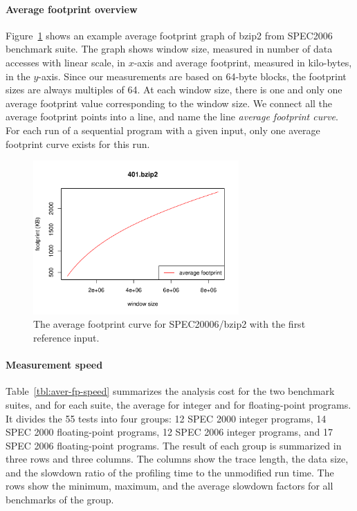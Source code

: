 \paragraph{Average footprint overview}
Figure~\ref{fig:aver-fp-bzip2} shows an example average footprint
graph of bzip2 from SPEC2006 benchmark suite. The graph shows window
size, measured in number of data accesses with linear scale, in
$x$-axis and average footprint, measured in kilo-bytes, in the
$y$-axis. Since our measurements are based on 64-byte blocks, the
footprint sizes are always multiples of 64. At each window size, there
is one and only one average footprint value corresponding to the window
size. We connect all the average footprint points into a line, and
name the line {\em average footprint curve}. For each run of a
sequential program with a given input, only one average footprint curve
exists for this run.

\begin{figure}[!h]
  \centering
  \includegraphics[width=0.7\textwidth]{figures/fp/401_bzip2_fp}
  \caption{The average footprint curve for SPEC20006/bzip2 with
    the first reference input.}
  \label{fig:aver-fp-bzip2}
\end{figure}

\paragraph{Measurement speed}
Table~\ref{tbl:aver-fp-speed} summarizes the analysis cost for the two
benchmark suites, and for each suite, the average for integer and for
floating-point programs.  It divides the 55 tests into four groups: 12
SPEC 2000 integer programs, 14 SPEC 2000 floating-point programs, 12
SPEC 2006 integer programs, and 17 SPEC 2006 floating-point programs.
The result of each group is summarized in three rows and three
columns.  The columns show the trace length, the data size, and the
slowdown ratio of the profiling time to the unmodified run time.  The
rows show the minimum, maximum, and the average slowdown factors for all benchmarks
of the group.

